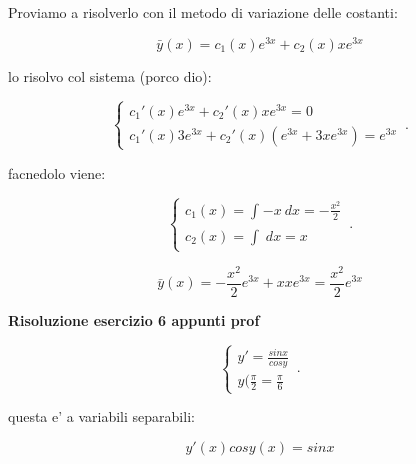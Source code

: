 \documentclass[11pt]{article}
\begin{document}
Proviamo a risolverlo con il metodo di variazione delle costanti:

\[
    \bar{y} (x) = c_1(x) e ^{3x}+ c_2(x) x e^{3x}
\]

lo risolvo col sistema (porco dio):

    \begin{equation}
        \begin{cases}
    c_1'(x)e ^{3x} + c_2'(x) x e ^{3x}=0 \\
    c_1'(x) 3 e ^{3x} + c_2'(x) (e ^{3x} + 3x e ^{3x}) = e ^{3x}
        \end{cases}\,.
    \end{equation}


facnedolo viene:

    \begin{equation}
        \begin{cases}
            c_1(x) = \int_{}^{} {-x} \: dx =-\frac{x^{2}}{2}\\
            c_2(x) = \int_{}^{} {} \: dx  = x
        \end{cases}\,.
    \end{equation}

\[
    \bar{y} (x) = - \frac{x^{2}}{2}e ^{3x} + x x e ^{3x} = \frac{x^{2}}{2}e ^{3x}
\]


\textbf{Risoluzione esercizio 6 appunti prof} 

    \begin{equation}
        \begin{cases}
            y'= \frac{sinx}{cosy}\\
            y( \frac{\pi}{2} = \frac{\pi}{6}
        \end{cases}\,.
    \end{equation}

questa e' a variabili separabili:

\[
    y'(x) cosy(x) = sinx
\]
\end{document}
